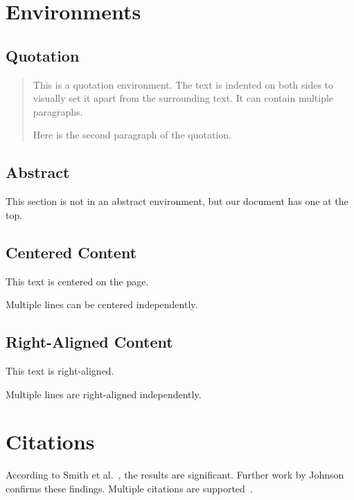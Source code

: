 \documentclass[12pt]{article}
\begin{document}
\section{Environments}

\subsection{Quotation}

\begin{quotation}
This is a quotation environment. The text is indented on both sides
to visually set it apart from the surrounding text. It can contain
multiple paragraphs.

Here is the second paragraph of the quotation.
\end{quotation}

\subsection{Abstract}

This section is not in an abstract environment, but our document
has one at the top.

\subsection{Centered Content}

\begin{center}
This text is centered on the page.

Multiple lines can be centered independently.
\end{center}

\subsection{Right-Aligned Content}

\begin{flushright}
This text is right-aligned.

Multiple lines are right-aligned independently.
\end{flushright}

\section{Citations}

According to Smith et al.~\cite{smith2024}, the results are significant.
Further work by Johnson~\cite{johnson2023} confirms these findings.
Multiple citations are supported~\cite{smith2024,johnson2023}.
\end{document}
